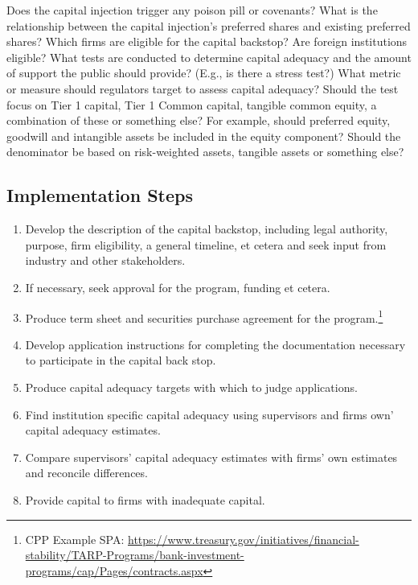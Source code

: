 \documentclass[12pt]{article}
\begin{document}
\begin{outline}[enumerate]
\2 Does the capital injection trigger any poison pill or covenants?
\2 What is the relationship between the capital injection's preferred shares and existing preferred shares? 
\1 Which firms are eligible for the capital backstop? 
\2 Are foreign institutions eligible?
\2 What tests are conducted to determine capital adequacy and the amount of support the public should provide? (E.g., is there a stress test?)
\2 What metric or measure should regulators target to assess capital adequacy?
\3 Should the test focus on Tier 1 capital, Tier 1 Common capital, tangible common equity, a combination of these or something else?
\4 For example, should preferred equity, goodwill and intangible assets be included in the equity component?
\4 Should the denominator be based on risk-weighted assets, tangible assets or something else?

\end{outline}

\subsection{Implementation Steps}

\begin{enumerate}

\item Develop the description of the capital backstop, including legal authority, purpose, firm eligibility, a general timeline, et cetera and seek input from industry and other stakeholders.
\item If necessary, seek approval for the program, funding et cetera.
\item Produce term sheet and securities purchase agreement for the program.\footnote{CPP Example SPA: \newline \url{https://www.treasury.gov/initiatives/financial-stability/TARP-Programs/bank-investment-programs/cap/Pages/contracts.aspx}}
\item Develop application instructions for completing the documentation necessary to participate in the capital back stop.
\item Produce capital adequacy targets with which to judge applications.
\item Find institution specific capital adequacy using supervisors and firms own' capital adequacy estimates. 
\item Compare supervisors' capital adequacy estimates with firms' own estimates and reconcile differences.
\item Provide capital to firms with inadequate capital. 

\end{enumerate}
\end{document}
